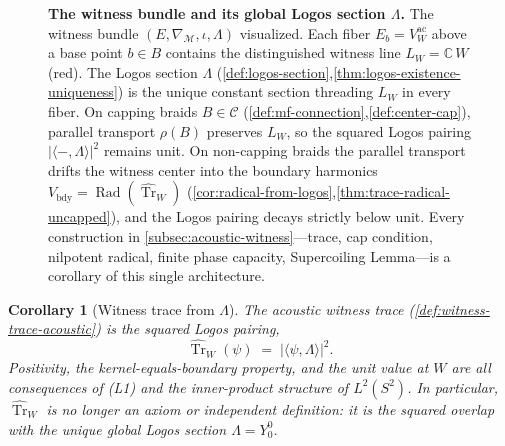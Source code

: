 \documentclass[11pt,a4paper]{article}
\theoremstyle{plain}
\newtheorem{corollary}[theorem]{Corollary}
\theoremstyle{definition}
\theoremstyle{remark}
\numberwithin{equation}{section}
\newcommand{\Complex}{\mathbb{C}}
\DeclareMathOperator{\Tr}{Tr}
\DeclareMathOperator{\Rad}{Rad}
\begin{document}
\begin{figure}[ht]
{}
\caption{\textbf{The witness bundle and its global Logos section
\(\Lambda\).}
The witness bundle
$(E,\nabla_{\mathcal{M}},\iota,\Lambda)$ visualized.  Each fiber
$E_b=V_W^{\mathrm{ac}}$ above a base point $b\in B$ contains the
distinguished witness line $L_W=\Complex\,W$ (red).  The Logos
section $\Lambda$ (\cref{def:logos-section},\cref{thm:logos-existence-uniqueness})
is the unique constant section threading $L_W$ in every fiber.
On capping braids $B\in\mathcal{C}$
(\cref{def:mf-connection},\cref{def:center-cap}), parallel
transport $\rho(B)$ preserves $L_W$, so the squared Logos pairing
$|\langle-,\Lambda\rangle|^{2}$ remains unit.  On non-capping
braids the parallel transport drifts the witness center into the
boundary harmonics $V_{\text{bdy}}=\Rad(\widehat{\Tr}_W)$
(\cref{cor:radical-from-logos},\cref{thm:trace-radical-uncapped}),
and the Logos pairing decays strictly below unit.  Every
construction in \cref{subsec:acoustic-witness}---trace, cap
condition, nilpotent radical, finite phase capacity, Supercoiling
Lemma---is a corollary of this single architecture.}
\label{fig:witness-bundle-logos}
\end{figure}

\begin{corollary}[Witness trace from $\Lambda$]
\label{cor:trace-from-logos}
The acoustic witness trace (\cref{def:witness-trace-acoustic}) is
the squared Logos pairing,
\[
  \widehat{\Tr}_W(\psi)
  \;=\;\bigl|\langle\psi,\Lambda\rangle\bigr|^2.
\]
Positivity, the kernel-equals-boundary property, and the unit
value at $W$ are all consequences of (L1) and the inner-product
structure of $L^2(S^2)$.  In particular, $\widehat{\Tr}_W$ is no
longer an axiom or independent definition: it is the squared
overlap with the unique global Logos section $\Lambda=Y_0^0$.
\end{corollary}
\end{document}
